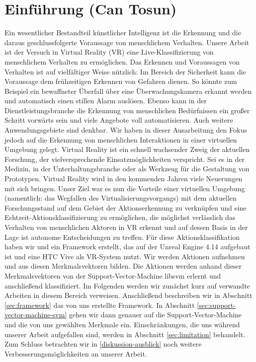 
\section{Einführung \tiny{(Can Tosun)}}

Ein wesentlicher Bestandteil künstlicher Intelligenz ist die Erkennung und die daraus geschlussfolgerte Voraussage von menschlichem Verhalten. Unsere Arbeit ist der Versuch in Virtual Reality (VR) eine Live-Klassifizierung von menschlichem Verhalten zu ermöglichen.\newline
Das Erkennen und Voraussagen von Verhalten ist auf vielfältiger Weise nützlich: Im Bereich der Sicherheit kann die Voraussage dem frühzeitigen Erkennen von Gefahren dienen. So könnte zum Beispiel ein bewaffneter Überfall über eine Überwachungskamera erkannt werden und automatisch einen stillen Alarm auslösen. Ebenso kann in der Dienstleistungsbranche die Erkennung von menschlichen Bedürfnissen ein großer Schritt vorwärts sein und viele Angebote voll automatisieren. Auch weitere Anwendungsgebiete sind denkbar. Wir haben in dieser Ausarbeitung den Fokus jedoch auf die Erkennung von menschlichen Interaktionen in einer virtuellen Umgebung gelegt.\newline
Virtual Reality ist ein schnell wachsender Zweig der aktuellen Forschung, der vielversprechende Einsatzmöglichkeiten verspricht. Sei es in der Medizin, in der Unterhaltungsbranche oder als Werkzeug für die Gestaltung von Prototypen. Virtual Reality wird in den kommenden Jahren viele Neuerungen mit sich bringen. Unser Ziel war es nun die Vorteile einer virtuellen Umgebung (namentlich: das Wegfallen des Virtualisierungsvorgangs) mit dem aktuellen Forschungsstand auf dem Gebiet der Aktionserkennung zu verknüpfen und eine Echtzeit-Aktionsklassifizierung zu ermöglichen, die möglichst verlässlich das Verhalten von menschlichen Aktoren in VR erkennt und auf dessen Basis in der Lage ist autonome Entscheidungen zu treffen. Für diese Aktionsklassifikation haben wir und ein Framework erstellt, das auf der Unreal Engine 4.14 aufgebaut ist und eine HTC Vive als VR-System nutzt. Wir werden Aktionen aufnehmen und aus diesen Merkmalsvektoren bilden. Die Aktionen werden anhand dieser Merkmalsvektoren von der Support-Vector-Machine libsvm erlernt und anschließend klassifiziert.\newline
Im Folgenden werden wir zunächst kurz auf verwandte Arbeiten in diesem Bereich verweisen. Anschließend beschreiben wir in Abschnitt \ref{sec:framework} das von uns erstellte Framework. In Abschnitt \ref{sec:support-vector-machine-svm} gehen wir dann genauer auf die Support-Vector-Machine und die von uns gewählten Merkmale ein. Einschränkungen, die uns während unserer Arbeit aufgefallen sind, werden in Abschnitt \ref{sec:limitation} behandelt. Zum Schluss betrachten wir in \ref{diskussion-ausblick} noch weitere Verbesserungsmöglichkeiten an unserer Arbeit.

